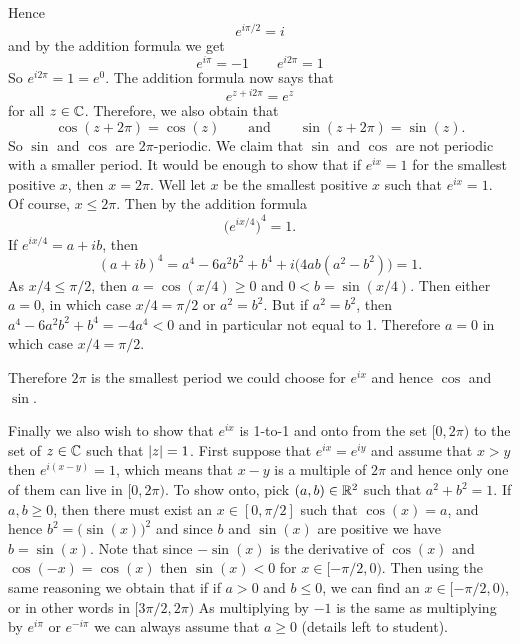Hence
\begin{equation*}
e^{i \pi /2} = i
\end{equation*}
and by the addition formula we get
\begin{equation*}
e^{i \pi} = -1
\qquad 
e^{i 2\pi} = 1
\end{equation*}
So $e^{i2\pi} = 1 = e^0$.  The addition formula now says
that
\begin{equation*}
e^{z+i2\pi} = e^z
\end{equation*}
for all $z \in {\mathbb{C}}$.  Therefore, we also obtain that
\begin{equation*}
\cos(z+2\pi) = \cos(z)
\qquad\text{and}\qquad
\sin(z+2\pi) = \sin(z) .
\end{equation*}
So $\sin$ and $\cos$ are $2\pi$-periodic.
We claim that $\sin$ and $\cos$ are not periodic with a smaller period.  It
would be enough to show that if $e^{ix} = 1$ for the
smallest positive $x$, then
$x = 2\pi$.
Well let $x$ be the smallest positive $x$ such that
$e^{ix} = 1$.
Of course, $x \leq 2\pi$.
Then by the addition formula
\begin{equation*}
{\bigl(e^{ix/4}\bigr)}^4 = 1  .
\end{equation*}
If $e^{ix/4} = a+ib$, then
\begin{equation*}
{(a+ib)}^4
=a^4-6a^2b^2+b^4 + i\bigl(4ab(a^2-b^2)\bigr)
=1 .
\end{equation*}
As $x/4 \leq \pi/2$, then $a = \cos(x/4) \geq 0$ and
$0 < b = \sin(x/4)$.  Then either $a = 0$, in which case
$x/4 = \pi/2$ or $a^2 = b^2$.  But if $a^2=b^2$, then
$a^4-6a^2b^2+b^4 = -4a^4 < 0$ and in particular not equal to 1.
Therefore $a=0$ in which case $x/4 = \pi/2$.

Therefore $2\pi$ is the smallest period we could choose for $e^{ix}$
and hence $\cos$ and $\sin$.

Finally we also wish to show that $e^{ix}$ is 1-to-1 and onto
from the set $[0,2\pi)$ to the set of $z \in {\mathbb{C}}$ such that
$\lvert {z} \rvert = 1$.  First suppose that $e^{ix} = e^{iy}$ and assume that
$x > y$ then
$e^{i(x-y)} = 1$, which means that $x-y$ is a multiple of $2\pi$ and hence
only one of them can live in $[0,2\pi)$.
To show onto, pick $(a,b) \in {\mathbb{R}}^2$ such that $a^2+b^2 = 1$.
If $a,b \geq 0$, then there must exist an $x \in [0,\pi/2]$ such that
$\cos(x) = a$, and hence $b^2 = \bigl(\sin(x)\bigr)^2$ and since
$b$ and $\sin(x)$ are positive we have $b = \sin(x)$.
Note that since $-\sin(x)$ is the derivative of $\cos(x)$
and $\cos(-x) = \cos(x)$ then $\sin(x) < 0$ for $x \in [-\pi/2,0)$.
Then using the same reasoning we obtain that if
if $a > 0$ and $b \leq 0$, we can find an $x \in [-\pi/2,0)$,
or in other words in $[3\pi/2,2\pi)$
As multiplying by $-1$ is the same as multiplying by $e^{i\pi}$ or
$e^{-i\pi}$
we can always assume that $a \geq 0$ (details left to student).

